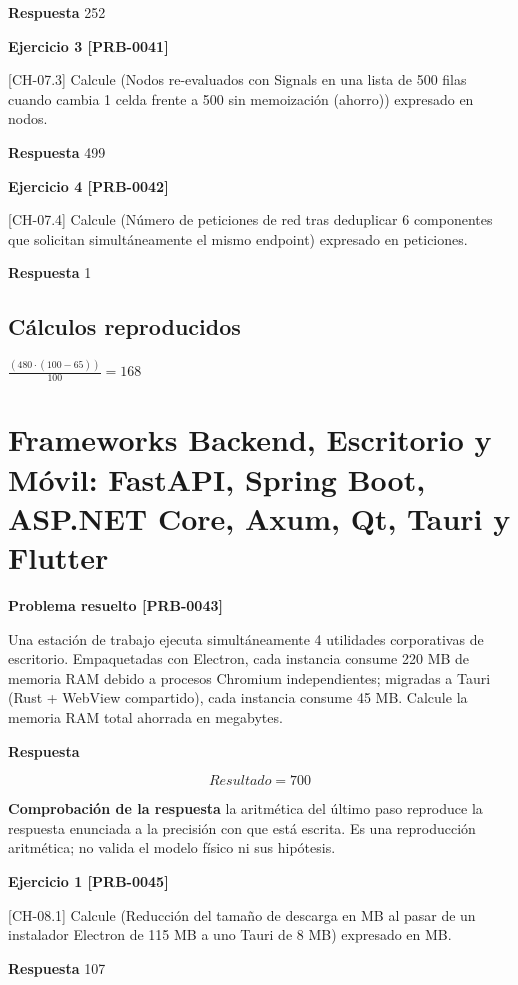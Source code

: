 \documentclass{book}
\begin{document}
\noindent\textbf{Respuesta} 252

\noindent\textbf{Ejercicio 3 [PRB-0041]}

[CH-07.3] Calcule (Nodos re-evaluados con Signals en una lista de 500 filas cuando cambia 1 celda frente a 500 sin memoización (ahorro)) expresado en nodos.

\noindent\textbf{Respuesta} 499

\noindent\textbf{Ejercicio 4 [PRB-0042]}

[CH-07.4] Calcule (Número de peticiones de red tras deduplicar 6 componentes que solicitan simultáneamente el mismo endpoint) expresado en peticiones.

\noindent\textbf{Respuesta} 1

\subsection*{Cálculos reproducidos}

\(\frac{\left(480\cdot \left(100-65\right)\right)}{100} = 168\)

\section{Frameworks Backend, Escritorio y Móvil: FastAPI, Spring Boot, ASP.NET Core, Axum, Qt, Tauri y Flutter}

\noindent\textbf{Problema resuelto [PRB-0043]}

Una estación de trabajo ejecuta simultáneamente 4 utilidades corporativas de escritorio. Empaquetadas con Electron, cada instancia consume 220 MB de memoria RAM debido a procesos Chromium independientes; migradas a Tauri (Rust + WebView compartido), cada instancia consume 45 MB. Calcule la memoria RAM total ahorrada en megabytes.

\noindent\textbf{Respuesta}

\[
Resultado = 700
\]

\noindent\textbf{Comprobación de la respuesta} la aritmética del último paso reproduce la respuesta enunciada a la precisión con que está escrita. Es una reproducción aritmética; no valida el modelo físico ni sus hipótesis.

\noindent\textbf{Ejercicio 1 [PRB-0045]}

[CH-08.1] Calcule (Reducción del tamaño de descarga en MB al pasar de un instalador Electron de 115 MB a uno Tauri de 8 MB) expresado en MB.

\noindent\textbf{Respuesta} 107
\end{document}
